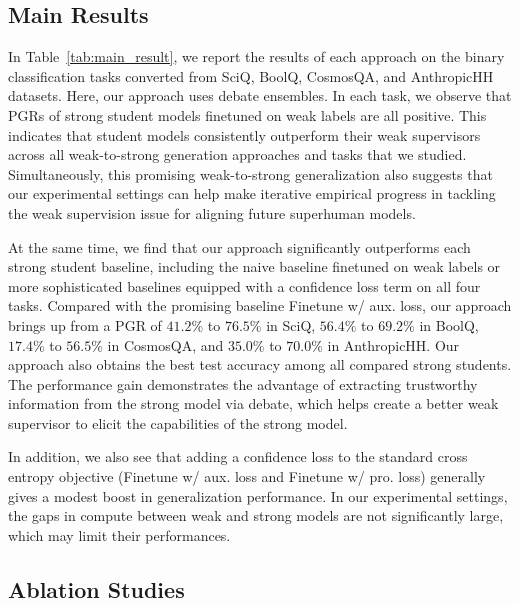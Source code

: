 \documentclass[letterpaper]{article} %
\begin{document}
\subsection{Main Results}

In Table~\ref{tab:main_result}, we report the results of each approach on the binary classification tasks converted from SciQ, BoolQ, CosmosQA, and AnthropicHH datasets.
Here, our approach uses debate ensembles.
In each task, we observe that PGRs of strong student models finetuned on weak labels are all positive.
This indicates that student models consistently outperform their weak supervisors across all weak-to-strong generation approaches and tasks that we studied.
Simultaneously, this promising weak-to-strong generalization also suggests that our experimental settings can help make iterative empirical progress in tackling the weak supervision issue for aligning future superhuman models.

At the same time, we find that our approach significantly outperforms each strong student baseline, including the naive baseline finetuned on weak labels or more sophisticated baselines equipped with a confidence loss term on all four tasks.
Compared with the promising baseline Finetune w/ aux. loss, our approach brings up from a PGR of $41.2\%$ to $76.5\%$ in SciQ, $56.4\%$ to $69.2\%$ in BoolQ, $17.4\%$ to $56.5\%$ in CosmosQA, and $35.0\%$ to $70.0\%$ in AnthropicHH.
Our approach also obtains the best test accuracy among all compared strong students.
The performance gain demonstrates the advantage of extracting trustworthy information from the strong model via debate, which helps create a better weak supervisor to elicit the capabilities of the strong model.

In addition, we also see that adding a confidence loss to the standard cross entropy objective (Finetune w/ aux. loss and Finetune w/ pro. loss) generally gives a modest boost in generalization performance.
In our experimental settings, the gaps in compute between weak and strong models are not significantly large, which may limit their performances.

\subsection{Ablation Studies}
\end{document}
